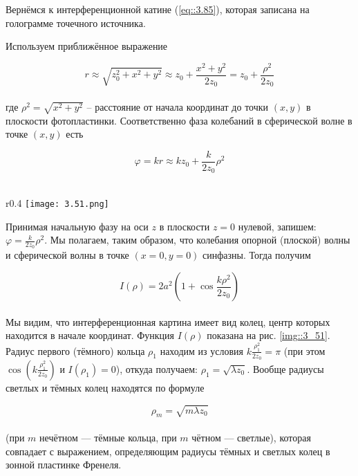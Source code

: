 Вернёмся к интерференционной катине (\ref{eq::3.85}), которая записана на голограмме точечного
источника. 

Используем приближённое выражение

\begin{equation}
r \approx \sqrt{z_0^2 + x^2 + y^2} \approx z_0 + \frac{x^2 + y^2}{2 z_0} = z_0 + \frac{\rho^2}{2 z_0}
\end{equation}
\\
где $\rho^2 = \sqrt{x^2 + y^2}$ -- расстояние от начала координат до точки $(x, y)$ в плоскости
фотопластинки. Соответственно фаза колебаний в сферической волне в точке $(x, y)$ есть

\begin{equation}
\varphi = k r \approx k z_0 + \frac{k}{2 z_0} \rho^2
\end{equation}
\\
\begin{wrapfigure}{r}{0.4\linewidth}
    \texttt{[image: 3.51.png]}
    \caption{Зависимость $I(\rho)$}
    \label{img::3_51}
\end{wrapfigure}

Принимая начальную фазу на оси $z$ в плоскости $z = 0$ нулевой, запишем:
$\varphi = \frac{k}{2 z_0} \rho^2$. Мы полагаем, таким образом, что колебания опорной (плоской)
волны и сферической волны в точке $(x = 0,y = 0)$ синфазны. Тогда получим

\begin{equation}
    I(\rho) = 2 a^2 \left( 1 + \cos \frac{k \rho^2}{2 z_0} \right)
\end{equation}
\\
Мы видим, что интерференционная картина имеет вид колец, центр которых находится в начале координат. 
Функция $I(\rho)$ показана на рис. \ref{img::3_51}. Радиус первого (тёмного) кольца $\rho_1$
находим из условия $k \frac{\rho_1^2}{2 z_0} = \pi$ (при этом 
$\cos \left( k \frac{\rho_1^2}{2 z_0} \right)$ и $I(\rho_1) = 0$), откуда получаем: 
$\rho_1 = \sqrt{\lambda z_0}$. Вообще радиусы светлых и тёмных колец находятся по формуле

\begin{equation}
    \rho_m  = \sqrt{m \lambda z_0}
\end{equation}
\\
(при $m$ нечётном — тёмные кольца, при $m$ чётном — светлые), которая совпадает с выражением, 
определяющим радиусы тёмных и светлых колец в зонной пластинке Френеля.

